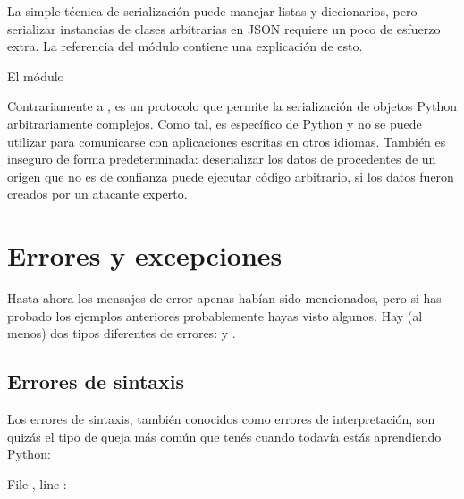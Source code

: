 \documentclass[a4,10pt,spanish]{sphinxmanual}
\begin{document}
\sphinxAtStartPar
La simple técnica de serialización puede manejar listas y diccionarios, pero serializar instancias de clases arbitrarias en JSON requiere un poco de esfuerzo extra. La referencia del módulo  contiene una explicación de esto.


\nopagebreak


\sphinxAtStartPar
{}  \sphinxhyphen{} El  módulo 

\sphinxAtStartPar
Contrariamente a {\hyperref[\detokenize{tutorial/inputoutput:tut-json}]{}},  es un protocolo que permite la serialización de objetos Python arbitrariamente complejos.  Como tal, es específico de Python y no se puede utilizar para comunicarse con aplicaciones escritas en otros idiomas.  También es inseguro de forma predeterminada: deserializar los datos de  procedentes de un origen que no es de confianza puede ejecutar código arbitrario, si los datos fueron creados por un atacante experto.




\chapter{Errores y excepciones}
\label{\detokenize{tutorial/errors:errors-and-exceptions}}\label{\detokenize{tutorial/errors:tut-errors}}\label{\detokenize{tutorial/errors::doc}}
\sphinxAtStartPar
Hasta ahora los mensajes de error apenas habían sido mencionados, pero si has probado los ejemplos anteriores probablemente hayas visto algunos.  Hay (al menos) dos tipos diferentes de errores:  y .


\section{Errores de sintaxis}
\label{\detokenize{tutorial/errors:syntax-errors}}\label{\detokenize{tutorial/errors:tut-syntaxerrors}}
\sphinxAtStartPar
Los errores de sintaxis, también conocidos como errores de interpretación, son quizás el tipo de queja más común que tenés cuando todavía estás aprendiendo Python:

\begin{sphinxVerbatim}[commandchars=\\\{\}]
  
  File , line 
      
: 
\end{sphinxVerbatim}
\end{document}
